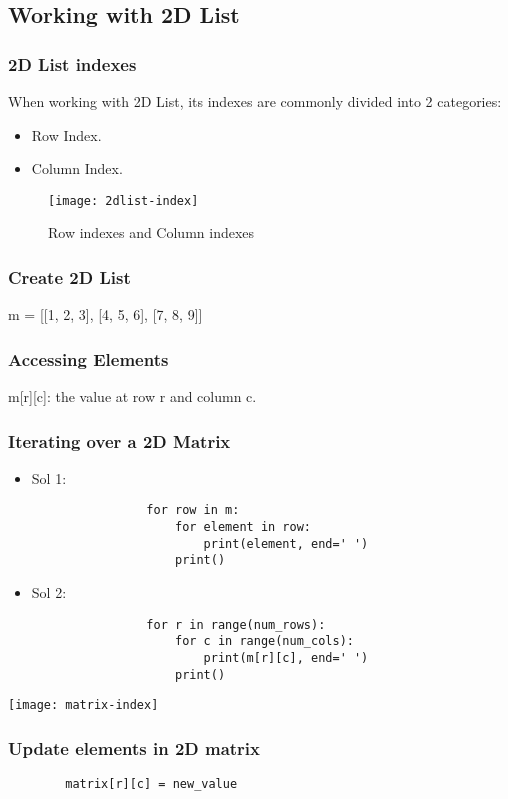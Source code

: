 \subsection{Working with 2D List}
\subsubsection{2D List indexes}
When working with 2D List, its indexes are commonly divided into 2 categories:
\begin{itemize}
	\item Row Index.
	\item Column Index.
\end{itemize}
\newpage

\begin{figure}[h]
	\centering
	\texttt{[image: 2dlist-index]}
	\caption{Row indexes and Column indexes}
	\label{fig:2dindex}
\end{figure}

\subsubsection{Create 2D List}
	\begin{center}
		m = [[1, 2, 3], [4, 5, 6], [7, 8, 9]]
	\end{center}

\subsubsection{Accessing Elements}
	\begin{center}
		m[r][c]: the value at row r and column c.
	\end{center}
	
\subsubsection{Iterating over a 2D Matrix}
\noindent
\begin{minipage}[c]{0.55\textwidth}
	\begin{itemize}
		\item Sol 1:
			\begin{verbatim}
				for row in m:
					for element in row:
						print(element, end=' ')
					print()
			\end{verbatim}
		\item Sol 2:
			\begin{verbatim}
				for r in range(num_rows):
					for c in range(num_cols):
						print(m[r][c], end=' ')
					print()
			\end{verbatim}
	\end{itemize}
\end{minipage}%
\hfill
\begin{minipage}[t]{0.4\textwidth}
	\texttt{[image: matrix-index]}
\end{minipage}


\subsubsection{Update elements in 2D matrix}
\begin{center}
	\begin{verbatim}
		matrix[r][c] = new_value
	\end{verbatim}
\end{center}